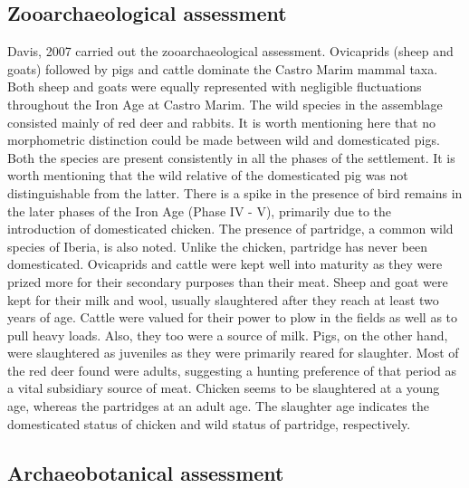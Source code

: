 \documentclass[3p]{elsarticle} %
\begin{document}
\hypertarget{zooarchaeological-assessment}{%
\subsection{Zooarchaeological assessment}\label{zooarchaeological-assessment}}

Davis, 2007 carried out the zooarchaeological assessment. Ovicaprids (sheep and goats) followed by pigs and cattle dominate the Castro Marim mammal taxa. Both sheep and goats were equally represented with negligible fluctuations throughout the Iron Age at Castro Marim. The wild species in the assemblage consisted mainly of red deer and rabbits. It is worth mentioning here that no morphometric distinction could be made between wild and domesticated pigs. Both the species are present consistently in all the phases of the settlement. It is worth mentioning that the wild relative of the domesticated pig was not distinguishable from the latter. There is a spike in the presence of bird remains in the later phases of the Iron Age (Phase IV - V), primarily due to the introduction of domesticated chicken. The presence of partridge, a common wild species of Iberia, is also noted. Unlike the chicken, partridge has never been domesticated. Ovicaprids and cattle were kept well into maturity as they were prized more for their secondary purposes than their meat. Sheep and goat were kept for their milk and wool, usually slaughtered after they reach at least two years of age. Cattle were valued for their power to plow in the fields as well as to pull heavy loads. Also, they too were a source of milk. Pigs, on the other hand, were slaughtered as juveniles as they were primarily reared for slaughter. Most of the red deer found were adults, suggesting a hunting preference of that period as a vital subsidiary source of meat. Chicken seems to be slaughtered at a young age, whereas the partridges at an adult age. The slaughter age indicates the domesticated status of chicken and wild status of partridge, respectively.

\hypertarget{archaeobotanical-assessment}{%
\subsection{Archaeobotanical assessment}\label{archaeobotanical-assessment}}
\end{document}
